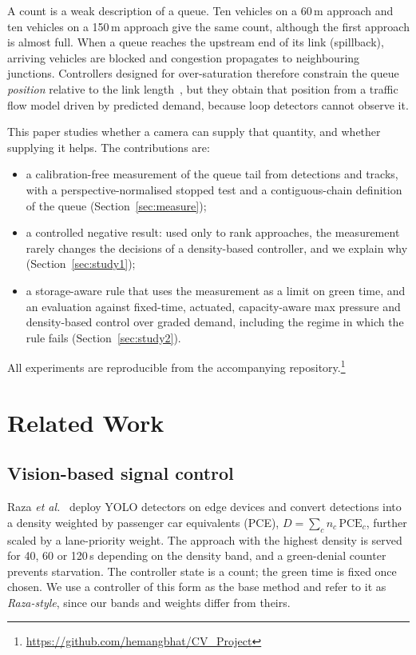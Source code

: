 \documentclass[conference]{IEEEtran}
\begin{document}
A count is a weak description of a queue. Ten vehicles on a 60\,m approach and ten
vehicles on a 150\,m approach give the same count, although the first approach is
almost full. When a queue reaches the upstream end of its link (spillback), arriving
vehicles are blocked and congestion propagates to neighbouring junctions. Controllers
designed for over-saturation therefore constrain the queue \emph{position} relative to
the link length~\cite{mohajerpoor2023}, but they obtain that position from a traffic
flow model driven by predicted demand, because loop detectors cannot observe it.

This paper studies whether a camera can supply that quantity, and whether supplying it
helps. The contributions are:
\begin{itemize}
\item a calibration-free measurement of the queue tail from detections and tracks,
with a perspective-normalised stopped test and a contiguous-chain definition of the
queue (Section~\ref{sec:measure});
\item a controlled negative result: used only to rank approaches, the measurement rarely changes the decisions of a density-based controller, and we explain why
(Section~\ref{sec:study1});
\item a storage-aware rule that uses the measurement as a limit on green time, and an
evaluation against fixed-time, actuated, capacity-aware max pressure and
density-based control over graded demand, including the regime in which the rule
fails (Section~\ref{sec:study2}).
\end{itemize}
All experiments are reproducible from the accompanying repository.\footnote{\url{https://github.com/hemangbhat/CV_Project}}

\section{Related Work}
\subsection{Vision-based signal control}
Raza \emph{et al.}~\cite{raza2025} deploy YOLO detectors on edge devices and convert
detections into a density weighted by passenger car equivalents (PCE),
$D=\sum_c n_c\,\mathrm{PCE}_c$, further scaled by a lane-priority weight. The approach
with the highest density is served for 40, 60 or 120\,s depending on the density band,
and a green-denial counter prevents starvation. The controller state is a count; the
green time is fixed once chosen. We use a controller of this form as the base method
and refer to it as \emph{Raza-style}, since our bands and weights differ from theirs.
\end{document}
